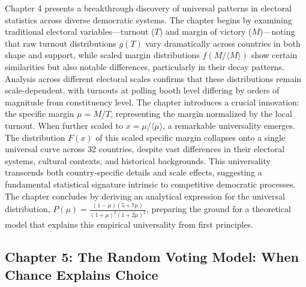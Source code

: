 Chapter 4 presents a breakthrough discovery of universal patterns in electoral statistics across diverse democratic systems. The chapter begins by examining traditional electoral variables—turnout ($T$) and margin of victory ($M$)—noting that raw turnout distributions $g(T)$ vary dramatically across countries in both shape and support, while scaled margin distributions $f(M/\langle M \rangle)$ show certain similarities but also notable differences, particularly in their decay patterns. Analysis across different electoral scales confirms that these distributions remain scale-dependent, with turnouts at polling booth level differing by orders of magnitude from constituency level. The chapter introduces a crucial innovation: the specific margin $\mu = M/T$, representing the margin normalized by the local turnout. When further scaled to $x = \mu/\langle\mu\rangle$, a remarkable universality emerges. The distribution $F(x)$ of this scaled specific margin collapses onto a single universal curve across 32 countries, despite vast differences in their electoral systems, cultural contexts, and historical backgrounds. This universality transcends both country-specific details and scale effects, suggesting a fundamental statistical signature intrinsic to competitive democratic processes. The chapter concludes by deriving an analytical expression for the universal distribution, $P(\mu) = \frac{(1 - \mu)(5 + 7\mu)}{(1 + \mu)^2(1 + 2\mu)^2}$, preparing the ground for a theoretical model that explains this empirical universality from first principles.

\subsection*{Chapter 5: The Random Voting Model: When Chance Explains Choice}

